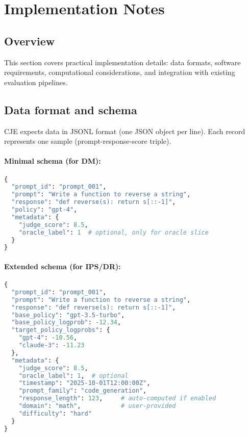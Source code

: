 \section{Implementation Notes}

\subsection{Overview}

This section covers practical implementation details: data formats, software requirements, computational considerations, and integration with existing evaluation pipelines.

\subsection{Data format and schema}

CJE expects data in JSONL format (one JSON object per line). Each record represents one sample (prompt-response-score triple).

\paragraph{Minimal schema (for DM):}
\begin{lstlisting}[language=Python,caption=DM Data Schema]
{
  "prompt_id": "prompt_001",
  "prompt": "Write a function to reverse a string",
  "response": "def reverse(s): return s[::-1]",
  "policy": "gpt-4",
  "metadata": {
    "judge_score": 8.5,
    "oracle_label": 1  # optional, only for oracle slice
  }
}
\end{lstlisting}

\paragraph{Extended schema (for IPS/DR):}
\begin{lstlisting}[language=Python,caption=Off-Policy Data Schema]
{
  "prompt_id": "prompt_001",
  "prompt": "Write a function to reverse a string",
  "response": "def reverse(s): return s[::-1]",
  "base_policy": "gpt-3.5-turbo",
  "base_policy_logprob": -12.34,
  "target_policy_logprobs": {
    "gpt-4": -10.56,
    "claude-3": -11.23
  },
  "metadata": {
    "judge_score": 8.5,
    "oracle_label": 1,  # optional
    "timestamp": "2025-10-01T12:00:00Z",
    "prompt_family": "code_generation",
    "response_length": 123,     # auto-computed if enabled
    "domain": "math",           # user-provided
    "difficulty": "hard"
  }
}
\end{lstlisting}

